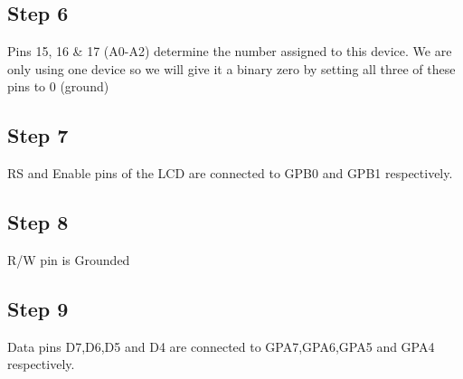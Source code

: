 \documentclass[a4paper,12pt,oneside]{book}
\begin{document}
\subsection*{Step 6}
Pins 15, 16 \& 17 (A0-A2) determine the number assigned to this device. We are only using one device so we will give it a binary zero by setting all three of these pins to 0 (ground)
\subsection*{Step 7}
RS and Enable pins of the LCD are connected to GPB0 and GPB1 respectively.
\subsection*{Step 8}
R/W pin is Grounded
\subsection*{Step 9}
Data pins D7,D6,D5 and D4 are connected to GPA7,GPA6,GPA5 and GPA4 respectively.
\end{document}
